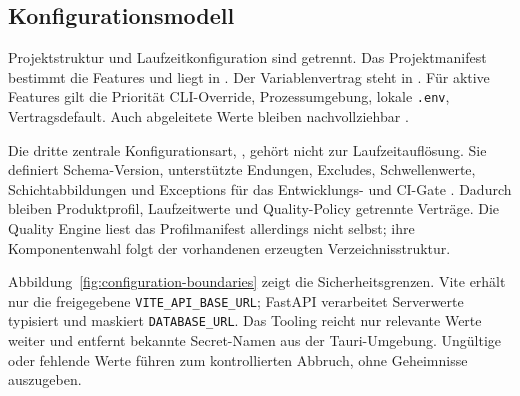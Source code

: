 \subsection{Konfigurationsmodell}
\label{subsec:konfigurationsmodell}

Projektstruktur und Laufzeitkonfiguration sind getrennt. Das Projektmanifest
bestimmt die Features und liegt in . Der
Variablenvertrag steht in . Für aktive Features gilt die
Priorität CLI-Override, Prozessumgebung, lokale \texttt{.env}, Vertragsdefault.
Auch abgeleitete Werte bleiben nachvollziehbar
\parencite{kleiveist2026configuration}.

Die dritte zentrale Konfigurationsart, , gehört
nicht zur Laufzeitauflösung. Sie definiert Schema-Version, unterstützte
Endungen, Excludes, Schwellenwerte, Schichtabbildungen und Exceptions für das
Entwicklungs- und CI-Gate \parencite{kleiveist2026quality-config}. Dadurch
bleiben Produktprofil, Laufzeitwerte und Quality-Policy getrennte Verträge.
Die Quality Engine liest das Profilmanifest allerdings nicht selbst; ihre
Komponentenwahl folgt der vorhandenen erzeugten Verzeichnisstruktur.

Abbildung~\ref{fig:configuration-boundaries} zeigt die Sicherheitsgrenzen.
Vite erhält nur die freigegebene \texttt{VITE\_API\_BASE\_URL}; FastAPI
verarbeitet Serverwerte typisiert und maskiert \texttt{DATABASE\_URL}. Das
Tooling reicht nur relevante Werte weiter und entfernt bekannte Secret-Namen
aus der Tauri-Umgebung. Ungültige oder fehlende Werte führen zum kontrollierten
Abbruch, ohne Geheimnisse auszugeben.


